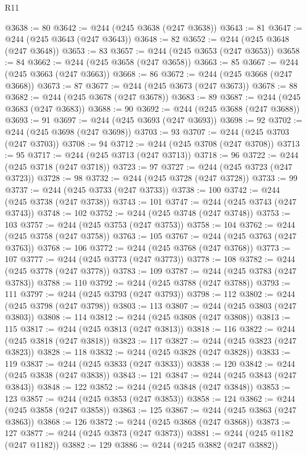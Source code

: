 \begin{lexlean}{R11}
\begin{coremodule}
{{{{{{{{{{{{{{{{{{{{{{{{{{{{{{{{{{{{{{{{{{{{{{{{{{{{{{{{{{{{{{{{{{{{{{{{{{{{{{{{{{@3638 := 80
@3642 := @244 (@245 @3638 (@247 @3638))
@3643 := 81
@3647 := @244 (@245 @3643 (@247 @3643))
@3648 := 82
@3652 := @244 (@245 @3648 (@247 @3648))
@3653 := 83
@3657 := @244 (@245 @3653 (@247 @3653))
@3658 := 84
@3662 := @244 (@245 @3658 (@247 @3658))
@3663 := 85
@3667 := @244 (@245 @3663 (@247 @3663))
@3668 := 86
@3672 := @244 (@245 @3668 (@247 @3668))
@3673 := 87
@3677 := @244 (@245 @3673 (@247 @3673))
@3678 := 88
@3682 := @244 (@245 @3678 (@247 @3678))
@3683 := 89
@3687 := @244 (@245 @3683 (@247 @3683))
@3688 := 90
@3692 := @244 (@245 @3688 (@247 @3688))
@3693 := 91
@3697 := @244 (@245 @3693 (@247 @3693))
@3698 := 92
@3702 := @244 (@245 @3698 (@247 @3698))
@3703 := 93
@3707 := @244 (@245 @3703 (@247 @3703))
@3708 := 94
@3712 := @244 (@245 @3708 (@247 @3708))
@3713 := 95
@3717 := @244 (@245 @3713 (@247 @3713))
@3718 := 96
@3722 := @244 (@245 @3718 (@247 @3718))
@3723 := 97
@3727 := @244 (@245 @3723 (@247 @3723))
@3728 := 98
@3732 := @244 (@245 @3728 (@247 @3728))
@3733 := 99
@3737 := @244 (@245 @3733 (@247 @3733))
@3738 := 100
@3742 := @244 (@245 @3738 (@247 @3738))
@3743 := 101
@3747 := @244 (@245 @3743 (@247 @3743))
@3748 := 102
@3752 := @244 (@245 @3748 (@247 @3748))
@3753 := 103
@3757 := @244 (@245 @3753 (@247 @3753))
@3758 := 104
@3762 := @244 (@245 @3758 (@247 @3758))
@3763 := 105
@3767 := @244 (@245 @3763 (@247 @3763))
@3768 := 106
@3772 := @244 (@245 @3768 (@247 @3768))
@3773 := 107
@3777 := @244 (@245 @3773 (@247 @3773))
@3778 := 108
@3782 := @244 (@245 @3778 (@247 @3778))
@3783 := 109
@3787 := @244 (@245 @3783 (@247 @3783))
@3788 := 110
@3792 := @244 (@245 @3788 (@247 @3788))
@3793 := 111
@3797 := @244 (@245 @3793 (@247 @3793))
@3798 := 112
@3802 := @244 (@245 @3798 (@247 @3798))
@3803 := 113
@3807 := @244 (@245 @3803 (@247 @3803))
@3808 := 114
@3812 := @244 (@245 @3808 (@247 @3808))
@3813 := 115
@3817 := @244 (@245 @3813 (@247 @3813))
@3818 := 116
@3822 := @244 (@245 @3818 (@247 @3818))
@3823 := 117
@3827 := @244 (@245 @3823 (@247 @3823))
@3828 := 118
@3832 := @244 (@245 @3828 (@247 @3828))
@3833 := 119
@3837 := @244 (@245 @3833 (@247 @3833))
@3838 := 120
@3842 := @244 (@245 @3838 (@247 @3838))
@3843 := 121
@3847 := @244 (@245 @3843 (@247 @3843))
@3848 := 122
@3852 := @244 (@245 @3848 (@247 @3848))
@3853 := 123
@3857 := @244 (@245 @3853 (@247 @3853))
@3858 := 124
@3862 := @244 (@245 @3858 (@247 @3858))
@3863 := 125
@3867 := @244 (@245 @3863 (@247 @3863))
@3868 := 126
@3872 := @244 (@245 @3868 (@247 @3868))
@3873 := 127
@3877 := @244 (@245 @3873 (@247 @3873))
@3881 := @244 (@245 @1182 (@247 @1182))
@3882 := 129
@3886 := @244 (@245 @3882 (@247 @3882))
}}}}}}}}}}}}}}}}}}}}}}}}}}}}}}}}}}}}}}}}}}}}}}}}}}}}}}}}}}}}}}}}}}}}}}}}}}}}}}}}}}
\end{coremodule}
\end{lexlean}
